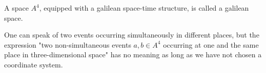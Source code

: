 A space $A^4$, equipped with a galilean space-time structure, is called a galilean space.

One can speak of two events occurring simultaneously in different places, but the expression "two non-simultaneous events $a, b \in A^4$ occurring at one and the same place in three-dimensional space" has no meaning as long as we have not chosen a coordinate system.

